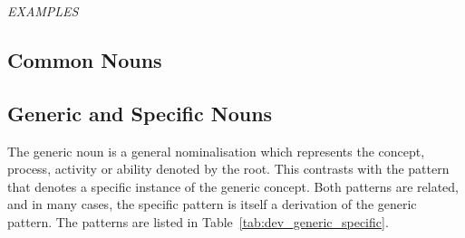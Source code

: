 \documentclass[grammar]{subfiles}
\begin{document}
  \begin{exe}
    \ex \emph{EXAMPLES}
  \end{exe}

  \subsection{Common Nouns}
  \label{ssec:dev_common_nouns}

  \ToBeWritten

  \subsection{Generic and Specific Nouns}
  \label{ssec:dev_generic_nouns}

  The generic noun is a general nominalisation which represents the concept, process, activity or ability denoted by the root. This contrasts with the pattern that denotes a specific instance of the generic concept. Both patterns are related, and in many cases, the specific pattern is itself a derivation of the generic pattern. The patterns are listed in Table~\ref{tab:dev_generic_specific}.
\end{document}
